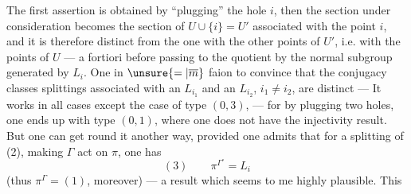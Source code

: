 The first assertion is obtained by ``plugging''
the hole $i$, then the section under consideration becomes
the section of $U\cup\{i\}=U'$ associated with the point $i$,
and it is therefore distinct from the one 
with the  other points of $U'$, i.e. with the points of
$U$ --- a fortiori before passing to the
quotient by the normal subgroup generated
by $L_i$. One  in $\unsure{=|\overline m}$ faion to
convince  that the conjugacy classes 
splittings associated with an $L_{i_1}$ and an $L_{i_2}$, $i_1\ne i_2$,
are distinct --- It works in all
cases except the case of type $(0,3)$, ---
for by plugging two holes, one ends up
with type $(0,1)$, where one does not have
the injectivity result. But one
can get round it another way, provided
one admits that for a splitting of
(2), making $\Gamma$ act on $\pi$, one has
\[
(3)\qquad\pi^{\Gamma^\circ}=L_i
\]
(thus $\pi^\Gamma=(1)$, moreover) --- a result
which seems to me highly plausible. This
